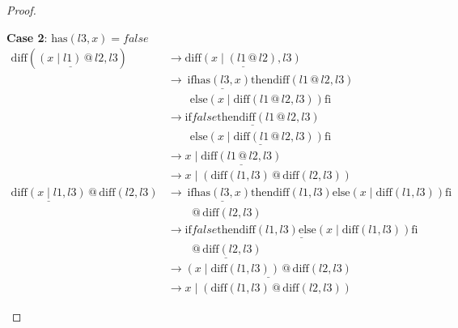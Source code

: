 \documentclass[12pt, a4paper]{article}
\newcommand{\rel}[1]{\mathrel{#1}}
\newcommand{\rmx}[1]{\mathrm{#1}}
\newcommand{\larrow}{\longrightarrow}
\newcommand{\under}{\underline}
\begin{document}
\begin{proof}
\begin{description}
\textbf{Case 2}: $\rmx{has}(l3, x) = false$
\begin{align*}
\rmx{diff}(\under{(x \rel{|} l1) \rel{@} l2}, l3)
	&\larrow \under{\rmx{diff}(x \rel{|} (l1 \rel{@} l2), l3)} \tag{by @2} \\
	&\larrow\ \rel{\rmx{if}} \under{\rmx{has}(l3, x)} \rel{\rmx{then}} \rmx{diff}(l1 \rel{@} l2, l3) \\
	&\quad \quad \rel{\rmx{else}} (x \rel{|} \rmx{diff}(l1 \rel{@} l2, l3)) \rel{\rmx{fi}} \tag{by diff2} \\
	&\larrow \under{\rel{\rmx{if}} false \rel{\rmx{then}} \rmx{diff}(l1 \rel{@} l2, l3)} \\
	&\quad \quad \under{\rel{\rmx{else}} (x \rel{|} \rmx{diff}(l1 \rel{@} l2, l3)) \rel{\rmx{fi}}} \tag{by case splitting} \\
	&\larrow x \rel{|} \under{\rmx{diff}(l1 \rel{@} l2, l3)} \tag{by if2} \\
	&\larrow x \rel{|} (\rmx{diff}(l1, l3) \rel{@} \rmx{diff}(l2, l3)) \tag{by IH} \\
\under{\rmx{diff}(x \rel{|} l1, l3)} \rel{@} \rmx{diff}(l2, l3)
	&\larrow\ \rel{\rmx{if}} \under{\rmx{has}(l3, x)} \rel{\rmx{then}} \rmx{diff}(l1, l3) \rel{\rmx{else}} (x \rel{|} \rmx{diff}(l1, l3)) \rel{\rmx{fi}} \\
	&\quad \quad \rel{@} \rmx{diff}(l2, l3) \tag{by diff2} \\
	&\larrow \under{\rel{\rmx{if}} false \rel{\rmx{then}} \rmx{diff}(l1, l3) \rel{\rmx{else}} (x \rel{|} \rmx{diff}(l1, l3)) \rel{\rmx{fi}}} \\
	&\quad \quad \under{\rel{@} \rmx{diff}(l2, l3)} \tag{by case splitting} \\
	&\larrow \under{(x \rel{|} \rmx{diff}(l1, l3)) \rel{@} \rmx{diff}(l2, l3)} \tag{by if2} \\
	&\larrow x \rel{|} (\rmx{diff}(l1, l3) \rel{@} \rmx{diff}(l2, l3)) \tag{by @2}
\end{align*}

\end{description}
\end{proof}
\end{document}

